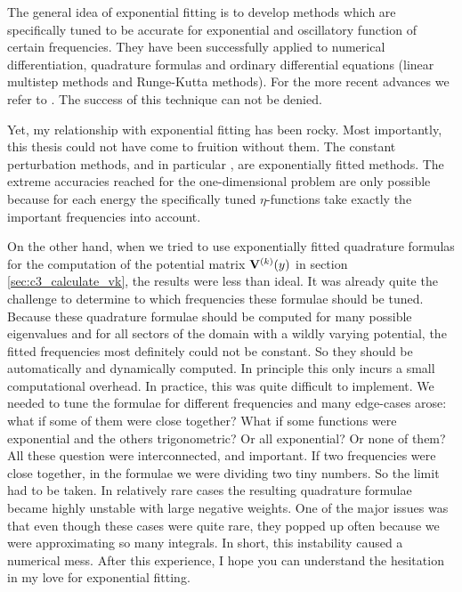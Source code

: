 The general idea of exponential fitting is to develop methods which are specifically tuned to be accurate for exponential and oscillatory function of certain frequencies. They have been successfully applied to numerical differentiation, quadrature formulas and ordinary differential equations (linear multistep methods and Runge-Kutta methods)\cite{ixaru_exponential_2004}. For the more recent advances we refer to \cite{paternoster_present_2012}. The success of this technique can not be denied.

Yet, my relationship with exponential fitting has been rocky. Most importantly, this thesis could not have come to fruition without them. The constant perturbation methods, and in particular \matslise, are exponentially fitted methods. The extreme accuracies reached for the one-dimensional problem are only possible because for each energy the specifically tuned $\eta$-functions take exactly the important frequencies into account.

On the other hand, when we tried to use exponentially fitted quadrature formulas for the computation of the potential matrix $\vb{V}^{(k)}(y)$ in section \ref{sec:c3_calculate_vk}, the results were less than ideal. It was already quite the challenge to determine to which frequencies these formulae should be tuned. Because these quadrature formulae should be computed for many possible eigenvalues and for all sectors of the domain with a wildly varying potential, the fitted frequencies most definitely could not be constant. So they should be automatically and dynamically computed. In principle this only incurs a small computational overhead. In practice, this was quite difficult to implement. We needed to tune the formulae for different frequencies and many edge-cases arose: what if some of them were close together? What if some functions were exponential and the others trigonometric? Or all exponential? Or none of them? All these question were interconnected, and important. If two frequencies were close together, in the formulae we were dividing two tiny numbers. So the limit had to be taken. In relatively rare cases the resulting quadrature formulae became highly unstable with large negative weights. One of the major issues was that even though these cases were quite rare, they popped up often because we were approximating so many integrals. In short, this instability caused a numerical mess. After this experience, I hope you can understand the hesitation in my love for exponential fitting.

